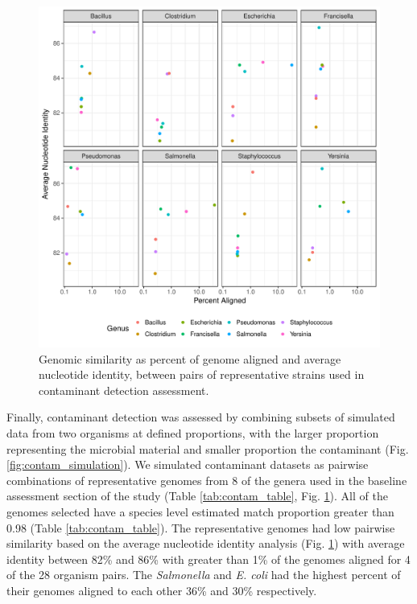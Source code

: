 \documentclass[fleqn,10pt,lineno]{wlpeerj}\usepackage[]{graphicx}\usepackage[]{color}
\makeatletter
\def\maxwidth{ %
  \ifdim\Gin@nat@width>\linewidth
    \linewidth
  \else
    \Gin@nat@width
  \fi
}
\newenvironment{knitrout}{}{} %
\makeatother
\begin{document}
\begin{knitrout}
\color{fgcolor}\begin{figure}
\includegraphics[width=\maxwidth]{figure/contam_ani-1} \caption[Genomic similarity as percent of genome aligned and average nucleotide identity, between pairs of representative strains used in contaminant detection assessment]{Genomic similarity as percent of genome aligned and average nucleotide identity, between pairs of representative strains used in contaminant detection assessment.}\label{fig:contam_ani}
\end{figure}


\end{knitrout}


Finally, contaminant detection was assessed by combining subsets of simulated data from two organisms at defined proportions,
with the larger proportion representing the microbial material and smaller proportion the contaminant (Fig. \ref{fig:contam_simulation}).
We simulated contaminant datasets as pairwise combinations of representative genomes from 8 of the genera used in the baseline assessment section of the study (Table \ref{tab:contam_table}, Fig. \ref{fig:contam_ani}).
All of the genomes selected have a species level estimated match proportion greater than 0.98 (Table \ref{tab:contam_table}). 
The representative genomes had low pairwise similarity based on the average nucleotide identity analysis (Fig. \ref{fig:contam_ani}) with average identity between 82\% and 86\% with greater than 1\% of the genomes aligned for 4 of the 28 organism pairs. 
The \textit{Salmonella} and \textit{E. coli} had the highest percent of their genomes aligned to each other 36\% and 30\% respectively. 
\end{document}
